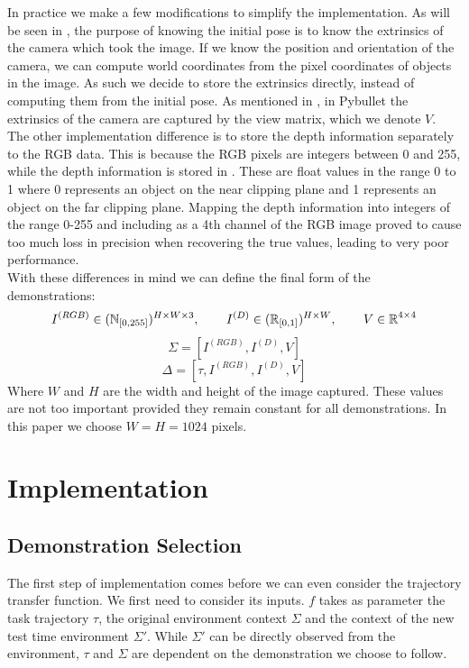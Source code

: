 In practice we make a few modifications to simplify the implementation. As will be seen in , the purpose of knowing the initial pose is to know the extrinsics of the camera which took the image. If we know the position and orientation of the camera, we can compute world coordinates from the pixel coordinates of objects in the image. As such we decide to store the extrinsics directly, instead of computing them from the initial pose. As mentioned in , in Pybullet the extrinsics of the camera are captured by the view matrix, which we denote $V$.\\

The other implementation difference is to store the depth information separately to the RGB data. This is because the RGB pixels are integers between 0 and 255, while the depth information is stored in  \cite{ndc}. These are float values in the range 0 to 1 where 0 represents an object on the near clipping plane and 1 represents an object on the far clipping plane. Mapping the depth information into integers of the range 0-255 and including as a 4th channel of the RGB image proved to cause too much loss in precision when recovering the true values, leading to very poor performance.\\

With these differences in mind we can define the final form of the demonstrations:
$$I^{(RGB)} \in (\operatorname{\mathbb{N}}_{[0,255]})^{H \times W \times 3}, \operatorname{\operatorname{\: \: \: \:} \operatorname{\: \: \: \:}}
I^{(D)} \in (\operatorname{\mathbb{R}}_{[0,1]})^{H \times W}, \operatorname{\operatorname{\: \: \: \:} \operatorname{\: \: \: \:}}
V \in \operatorname{\mathbb{R}}^{4 \times 4}$$
$$\Sigma = [I^{(RGB)}, I^{(D)}, V]$$
$$\Delta = [\tau, I^{(RGB)}, I^{(D)}, V]$$
Where $W$ and $H$ are the width and height of the image captured. These values are not too important provided they remain constant for all demonstrations. In this paper we choose $W=H=1024$ pixels.


\section{Implementation}
\label{sec:implementation}

\subsection{Demonstration Selection}

The first step of implementation comes before we can even consider the trajectory transfer function. We first need to consider its inputs. $f$ takes as parameter the task trajectory $\tau$, the original environment context $\Sigma$ and the context of the new test time environment $\Sigma'$. While $\Sigma'$ can be directly observed from the environment, $\tau$ and $\Sigma$ are dependent on the demonstration we choose to follow.\\

